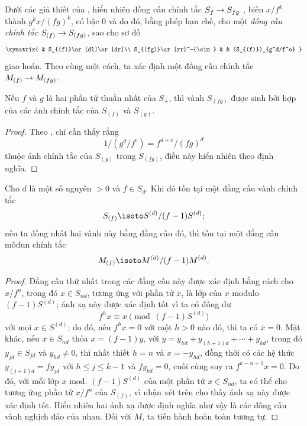 \documentclass[oneside,10pt]{amsart}
\makeatletter
\renewcommand{\leq}{\leqslant}
\newcommand{\ega@arrow}[2]{\mathchoice{#1}{#2}{#2}{#2}}
\renewcommand{\to}{\ega@arrow{\longrightarrow}{\rightarrow}}
\newcommand{\oldpage}[2][]{\marginnote{\normalfont\footnotesize\textbf{#1}~|~#2}\ignorespaces}
\let\EGAOriginalLabel\label
\renewcommand{\label}[1]{\phantomsection\EGAOriginalLabel{#1}}
\makeatother
\begin{document}
\begin{env}[2.2.3]
\label{II.2.2.3}
Dưới các giả thiết của , hiển nhiên đồng cấu chính tắc $S_f\to S_{fg}$ , biến $x/f^k$ thành $g^kx/(fg)^k$, có bậc $0$ và do đó, bằng phép hạn chế, cho một \emph{đồng cấu chính tắc $S_{(f)}\to S_{(fg)}$}, sao cho sơ đồ
\[
  \xymatrix{
    & S_{(f)}\ar[dl]\ar[dr]\\
    S_{(fg)}\ar[rr]^-{\sim} & &
    (S_{(f)})_{g^d/f^e}
  }
\]
giao hoán.
Theo cùng một cách, ta xác định một đồng cấu chính tắc $M_{(f)}\to M_{(fg)}$.
\end{env}

\begin{lemma}[2.2.4]
\label{II.2.2.4}
Nếu $f$ và $g$ là hai phần tử thuần nhất của $S_+$, thì vành $S_{(fg)}$ được sinh bởi hợp của các ảnh chính tắc của $S_{(f)}$ và $S_{(g)}$.
\end{lemma}

\begin{proof}
Theo , chỉ cần thấy rằng
\[
  1/(g^d/f^e)=f^{d+e}/(fg)^d
\]
thuộc ảnh chính tắc của $S_{(g)}$ trong $S_{(fg)}$, điều này hiển nhiên theo định nghĩa.
\end{proof}

\begin{proposition}[2.2.5]
\label{II.2.2.5}
Cho $d$ là một số nguyên $>0$ và $f\in S_d$.
Khi đó tồn tại một đẳng cấu vành chính tắc
\[
  S_{(f)}\isoto S^{(d)}/(f-1)S^{(d)};
\]
nếu ta đồng nhất hai vành này bằng đẳng cấu đó, thì tồn tại một đẳng cấu môđun chính tắc
\[
  M_{(f)}\isoto M^{(d)}/(f-1)M^{(d)}.
\]
\end{proposition}

\begin{proof}
Đẳng cấu thứ nhất trong các đẳng cấu này được xác định bằng cách cho $x/f^n$, trong đó $x\in S_{nd}$, tương ứng với phần tử $\overline{x}$, là lớp của $x$ modulo $(f-1)S^{(d)}$; ánh xạ này được xác định tốt vì ta có đồng dư
\[
  f^hx\equiv x\pmod{(f-1)S^{(d)}}
\]
với mọi $x\in S^{(d)}$; do đó, nếu $f^hx=0$ với một $h>0$ nào đó,
\oldpage[II]{25}
thì ta có $\overline{x}=0$.
Mặt khác, nếu $x\in S_{nd}$ thỏa $x=(f-1)y$, với
$y=y_{hd}+y_{(h+1)d}+\cdots+y_{kd}$, trong đó $y_{jd}\in S_{jd}$ và $y_{hd}\neq0$, thì nhất thiết $h=n$ và $x=-y_{hd}$, đồng thời có các hệ thức $y_{(j+1)d}=fy_{jd}$ với $h\leq j\leq k-1$ và $fy_{kd}=0$, cuối cùng suy ra $f^{k-n+1}x=0$.
Do đó, với mỗi lớp $\overline{x}\text{ mod. }(f-1)S^{(d)}$ của một phần tử $x\in S_{nd}$, ta có thể cho tương ứng phần tử $x/f^n$ của $S_{(f)}$, vì nhận xét trên cho thấy ánh xạ này được xác định tốt.
Hiển nhiên hai ánh xạ được định nghĩa như vậy là các đồng cấu vành nghịch đảo của nhau.
Đối với $M$, ta tiến hành hoàn toàn tương tự.
\end{proof}
\end{document}
